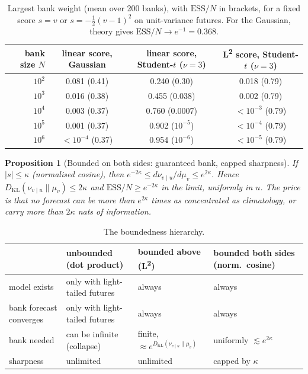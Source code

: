 \documentclass[11pt]{article}
\newcommand{\Ltwo}{L\textsuperscript{2}}
\newcommand{\KL}{D_{\mathrm{KL}}}
\newcommand{\vu}{{v\mid u}}
\theoremstyle{plain}
\newtheorem{proposition}{Proposition}
\theoremstyle{definition}
\theoremstyle{remark}
\begin{document}
\begin{table}[h]
\centering\small
\begin{tabular}{@{}rccc@{}}
\toprule
bank size $N$ & linear score, Gaussian & linear score, Student-$t$ ($\nu=3$) & \Ltwo{} score, Student-$t$ ($\nu=3$)\\
\midrule
$10^2$ & 0.081 \;(0.41) & 0.240 \;(0.30)\phantom{00} & 0.018 \;(0.79)\\
$10^3$ & 0.016 \;(0.38) & 0.455 \;(0.038)\phantom{0} & 0.002 \;(0.79)\\
$10^4$ & 0.003 \;(0.37) & 0.760 \;(0.0007) & $<10^{-3}$ (0.79)\\
$10^5$ & 0.001 \;(0.37) & 0.902 \;($10^{-5}$)\phantom{0} & $<10^{-4}$ (0.79)\\
$10^6$ & $<10^{-4}$ (0.37) & 0.954 \;($10^{-6}$)\phantom{0} & $<10^{-5}$ (0.79)\\
\bottomrule
\end{tabular}
\caption{Largest bank weight (mean over 200 banks), with $\mathrm{ESS}/N$ in brackets, for a
fixed score $s=v$ or $s=-\frac12(v-1)^2$ on unit-variance futures. For the Gaussian, theory
gives $\mathrm{ESS}/N\to e^{-1}=0.368$.}
\label{tab:collapse}
\end{table}

\begin{proposition}[Bounded on both sides: guaranteed bank, capped sharpness]\label{prop:twosided}
If $|s|\le\kappa$ (normalised cosine), then $e^{-2\kappa}\le d\nu_\vu/d\mu_v\le e^{2\kappa}$. Hence
$\KL(\nu_\vu\|\mu_v)\le2\kappa$ and $\mathrm{ESS}/N\ge e^{-2\kappa}$ in the limit, uniformly in $u$. The
price is that no forecast can be more than $e^{2\kappa}$ times as concentrated as climatology, or
carry more than $2\kappa$ nats of information.
\end{proposition}

\begin{table}[h]
\centering\small
\begin{tabularx}{\textwidth}{@{}lLLL@{}}
\toprule
& unbounded (dot product) & bounded above (\Ltwo{}) & bounded both sides (norm.\ cosine) \\
\midrule
model exists & only with light-tailed futures & always & always \\
bank forecast converges & only with light-tailed futures & always & always \\
bank needed & can be infinite (collapse) & finite, $\approx e^{\KL(\nu_\vu\|\mu_v)}$~\cite{cd} & uniformly $\lesssim e^{2\kappa}$ \\
sharpness & unlimited & unlimited & capped by $\kappa$ \\
\bottomrule
\end{tabularx}
\caption{The boundedness hierarchy.}
\label{tab:hierarchy}
\end{table}
\end{document}
